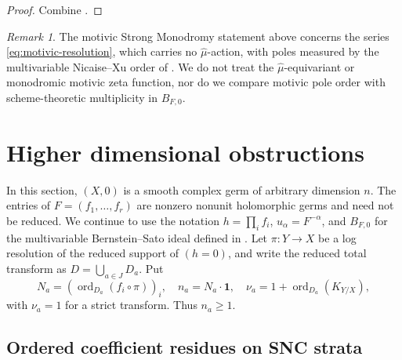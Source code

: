\documentclass[12pt]{amsart}
\numberwithin{equation}{section}
\theoremstyle{plain}
\theoremstyle{definition}
\theoremstyle{remark}
\newtheorem{remark}[theorem]{Remark}
\theoremstyle{definition}
\DeclareMathOperator{\ord}{ord}
\newcommand{\one}{\mathbf 1}
\begin{document}
\begin{proof}
Combine .
\end{proof}

\begin{remark}
The motivic Strong Monodromy statement above concerns the series \eqref{eq:motivic-resolution}, which carries no $\widehat\mu$-action, with poles measured by the multivariable Nicaise--Xu order of . We do not treat the $\widehat\mu$-equivariant or monodromic motivic zeta function, nor do we compare motivic pole order with scheme-theoretic multiplicity in $B_{F,0}$.
\end{remark}





\section{Higher dimensional obstructions}
\label{sec:higher-obstructions}

In this section, $(X,0)$ is a smooth complex germ of arbitrary dimension $n$. The entries of $F=(f_1,\ldots,f_r)$ are nonzero nonunit holomorphic germs and need not be reduced. We continue to use the notation $h=\prod_i f_i$, $u_\alpha=F^{-\alpha}$, and $B_{F,0}$ for the multivariable Bernstein--Sato ideal defined in . Let $\pi:Y\to X$ be a log resolution of the reduced support of $(h=0)$, and write the reduced total transform as $D=\bigcup_{a\in J}D_a$. Put
\begin{equation*}
N_a=(\ord_{D_a}(f_i\circ\pi))_i,
 \quad n_a=N_a\cdot\one,
 \quad \nu_a=1+\ord_{D_a}(K_{Y/X}),
\end{equation*}
with $\nu_a=1$ for a strict transform. Thus $n_a\geq1$.

\subsection{Ordered coefficient residues on SNC strata}
\end{document}
